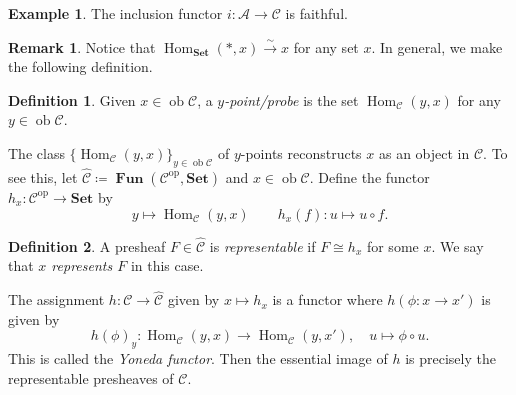 \documentclass[10pt,letterpaper,cm]{nupset}
\theoremstyle{definition}
\newtheorem*{definition}{Definition}
\newtheorem{exmp}{Example}
\newtheorem{remark}{Remark}
\newcommand{\1}{\mathbf{1}}
\renewcommand{\a}{\mathscr{A}}
\renewcommand{\c}{\mathscr{C}}
\newcommand{\0}{\vec 0}
\DeclareMathOperator{\op}{op}
\DeclareMathOperator{\ob}{ob}
\DeclareMathOperator{\Hom}{Hom}
\DeclareMathOperator{\Fun}{\mathbf{Fun}}
\begin{document}
\begin{exmp}
The inclusion functor $i : \a \to \c$ is faithful.
\end{exmp}

\begin{remark}
Notice that $\Hom_{\mathbf{Set}}(\ast, x) \overset{\sim}{\longrightarrow} x$ for any set $x$. In general, we make the following definition.
\begin{definition}
Given $x \in \ob \c$, a \textit{$y$-point/probe} is the set $\Hom_{\c}(y, x)$ for any $y \in \ob \c$.
\end{definition}
The class $\{\Hom_{\c}(y, x)\}_{y\in \ob \c}$ of $y$-points reconstructs $x$ as an object in $\c$. To see this, let $\widehat{\c}\coloneqq  \Fun(\c^{\op}, \mathbf{Set})$ and $x \in \ob \c$. Define the functor $h_x : \c^{\op} \to \mathbf{Set}$ by $$y \mapsto \Hom_{\c}(y, x) \quad \quad h_x(f) : u \mapsto u \circ f.$$ 
\begin{definition}
A presheaf $F \in \widehat{\c}$ is \textit{representable} if $F \cong h_x$ for some $x$. We say that \textit{$x$ represents $F$} in this case.
\end{definition}
The assignment $h: \c \to \widehat{\c}$ given by $x \mapsto h_x$ is a functor where $h(\phi : x \to x')$ is given by $$h(\phi)_y : \Hom_{\c}(y, x) \to \Hom_{\c}(y, x'), \quad u \mapsto \phi \circ u.$$ This is called the \textit{Yoneda functor}. Then the essential image of $h$ is precisely the representable presheaves of $\c$.
\end{remark}
\end{document}
